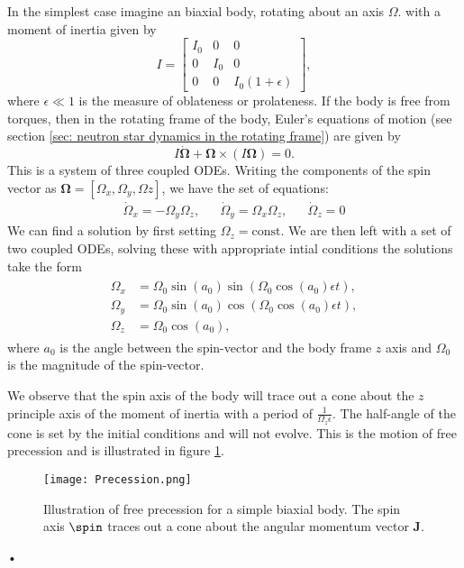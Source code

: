 In the simplest case imagine an biaxial body,
rotating about an axis $\Omega$. with a moment of inertia given by
\begin{equation}
    I = \left[\begin{array}{ccc}
            I_{0} & 0 & 0 \\
            0 & I_{0} & 0 \\
            0 & 0 & I_{0}(1 + \epsilon)
            \end{array}\right],
\end{equation}
where $\epsilon \ll 1$ is the measure of oblateness or prolateness.  If the
body is free from torques, then in the rotating frame of the body, Euler's
equations of motion (see section \ref{sec: neutron star dynamics in the
rotating frame}) are given by
\begin{equation}
    I\dot{\bm{\Omega}} + \bm{\Omega} \times \left(I\bm{\Omega}\right)=0.
\end{equation}
This is a system of three coupled ODEs. Writing the components of the spin
vector as $\bm{\Omega} = [\Omega_{x}, \Omega_{y}, \Omega{z}]$, we have the
set of equations:
\begin{align}
\dot{\Omega}_x = -\Omega_y\Omega_z, &&
\dot{\Omega}_y = \Omega_x \Omega_z, &&
\dot{\Omega}_z = 0
\end{align}
We can find a solution by first setting $\Omega_{z}=\mathrm{const}$.
We are then left with a set of
two coupled ODEs, solving these with appropriate intial conditions
the solutions take the form
\begin{align}
\begin{split}
    \Omega_{x} & = \Omega_{0}\sin(a_0)\sin\left(\Omega_{0}\cos(a_0)\epsilon t\right), \\
    \Omega_{y} & = \Omega_{0}\sin(a_0)\cos\left(\Omega_{0}\cos(a_0)\epsilon t\right),\\
    \Omega_{z} & = \Omega_0 \cos(a_0),
\end{split}
\end{align}
where $a_0$ is the angle between the spin-vector and the body frame $z$ axis and
$\Omega_0$ is the magnitude of the spin-vector.

We observe that the spin axis of the body will trace out a cone about the $z$
principle axis of the moment of inertia with a period of
$\frac{1}{\Omega_{z}\epsilon}$.  The half-angle of the cone is set by the
initial conditions and will not evolve. This is the motion of free precession
and is illustrated in figure \ref{fig: precession}.
\begin{figure}[htb]
\centering
\texttt{[image: Precession.png]}
\caption{Illustration of free precession for a simple biaxial body. The spin
    axis $\spin$ traces out a cone about the angular momentum vector $\mathbf{J}$.}
\label{fig: precession}
\end{figure}•

